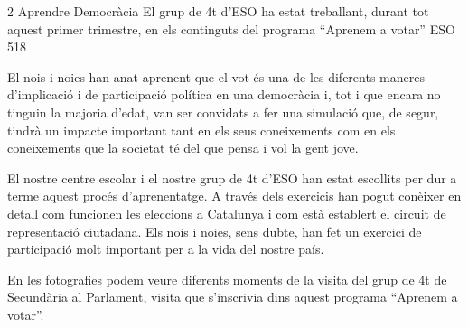 \begin{news}
{2} %
{Aprendre Democràcia}
{El grup de 4t d’ESO ha estat treballant, durant tot aquest primer trimestre, en els continguts del programa “Aprenem a votar”}
{ESO}
{518} %


El nois i noies han anat aprenent que el vot  és una de les diferents maneres d’implicació i de participació política en una democràcia i, tot i que encara no tinguin la majoria d’edat,  van ser convidats a fer una simulació que, de segur, tindrà un impacte important tant en els seus coneixements com en els coneixements que la societat té del que pensa i vol la gent jove.

El nostre centre escolar i el nostre grup de 4t d’ESO han estat escollits per dur a terme aquest procés d’aprenentatge. A través dels exercicis han pogut  conèixer en detall com funcionen les eleccions a Catalunya i com està establert el circuit de representació ciutadana. Els nois i noies, sens dubte,  han fet un exercici de participació molt important per a la vida del nostre país. 

En les fotografies podem veure diferents moments de la visita del grup de 4t de Secundària al Parlament, visita que s’inscrivia dins aquest programa “Aprenem a votar”.

\end{news}


